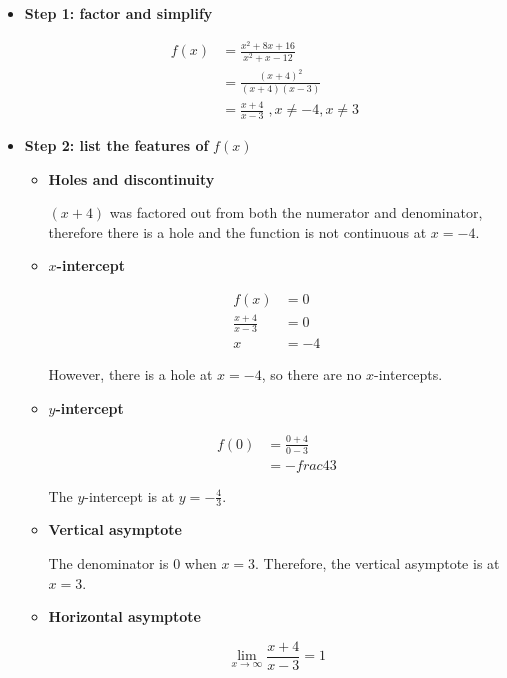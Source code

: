 \documentclass[12pt]{article}
\begin{document}
\begin{itemize}
    \item \textbf{Step 1: factor and simplify}

    \begin{align*}
        f(x) &= \frac{x^2 + 8x + 16}{x^2 + x - 12} \\[6pt]
        &= \frac{(x + 4)^2}{(x + 4)(x - 3)} \\[6pt]
        &= \frac{x + 4}{x - 3} \;, x \neq -4, x \neq 3
    \end{align*}

    \item \textbf{Step 2: list the features of} $f(x)$
    \begin{itemize}
        \item \textbf{Holes and discontinuity}

        $(x + 4)$ was factored out from both the numerator and denominator, therefore there is a hole and the function is not continuous at $x = -4$.

        \item \textbf{$x$-intercept}

        \begin{align*}
            f(x) &= 0 \\
            \frac{x + 4}{x - 3} &= 0 \\[6pt]
            x &= -4
        \end{align*}

        However, there is a hole at $x = -4$, so there are no $x$-intercepts.

        \item \textbf{$y$-intercept}

        \begin{align*}
            f(0) &= \frac{0 + 4}{0 - 3} \\[6pt]
            &= -frac{4}{3}
        \end{align*}

        The $y$-intercept is at $y = -\frac{4}{3}$.

        \item \textbf{Vertical asymptote}

        The denominator is $0$ when $x = 3$. Therefore, the vertical asymptote is at $x = 3$.

        \item \textbf{Horizontal asymptote}

        \[ \lim_{x \to \infty} \frac{x + 4}{x - 3} = 1 \]


\end{itemize}
\end{itemize}
\end{document}
